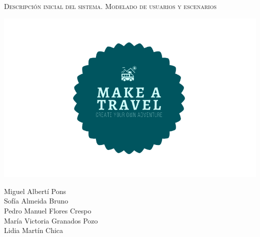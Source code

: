 \documentclass[11pt]{article}
\begin{document}
\begin{titlepage}
\centering
\vspace{4.5cm}
{\scshape\LARGE Descripción inicial del sistema. Modelado de usuarios y escenarios \par}
\vspace{1.5cm}

\includegraphics[width=16cm] {../Imagenes/Logo}

\vspace{3cm}
{\scshape\large \par}
\vspace{1cm}

{Miguel Albertí Pons\\
Sofía Almeida Bruno\\
Pedro Manuel Flores Crespo\\
María Victoria Granados Pozo\\
Lidia Martín Chica
\par}

\end{titlepage}


\newpage
\end{document}
